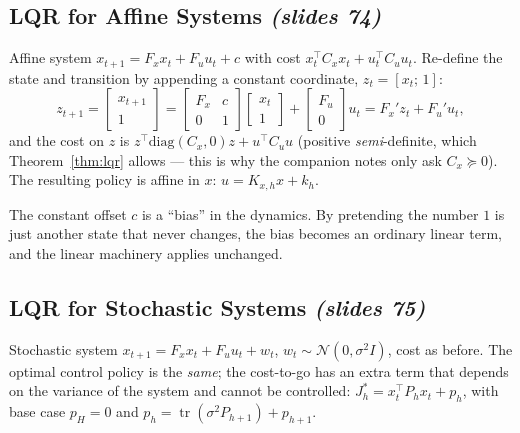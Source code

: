 \documentclass[11pt,a4paper]{article}
\newcommand{\tr}{\operatorname{tr}}
\newcommand{\slides}[1]{\emph{(slides #1)}}
\theoremstyle{plain}
\theoremstyle{definition}
\theoremstyle{remark}
\begin{document}
\subsection{LQR for Affine Systems \slides{74}}

Affine system $x_{t+1}=F_xx_t+F_uu_t+c$ with cost $x_t^\top C_xx_t+u_t^\top C_uu_t$. Re-define the state and transition by appending a constant coordinate, $z_t=[x_t;\,1]$:
\[
z_{t+1}=\begin{bmatrix}x_{t+1}\\1\end{bmatrix}=\begin{bmatrix}F_x&c\\0&1\end{bmatrix}\begin{bmatrix}x_t\\1\end{bmatrix}+\begin{bmatrix}F_u\\0\end{bmatrix}u_t=F_x'z_t+F_u'u_t,
\]
and the cost on $z$ is $z^\top\mathrm{diag}(C_x,0)z+u^\top C_uu$ (positive \emph{semi}-definite, which Theorem~\ref{thm:lqr} allows --- this is why the companion notes only ask $C_x\succeq0$). The resulting policy is affine in $x$: $u=K_{x,h}x+k_h$.
\begin{intuition}
The constant offset $c$ is a ``bias'' in the dynamics. By pretending the number $1$ is just another state that never changes, the bias becomes an ordinary linear term, and the linear machinery applies unchanged.
\end{intuition}

\subsection{LQR for Stochastic Systems \slides{75}}

Stochastic system $x_{t+1}=F_xx_t+F_uu_t+w_t$, $w_t\sim\mathcal N(0,\sigma^2I)$, cost as before. The optimal control policy is the \emph{same}; the cost-to-go has an extra term that depends on the variance of the system and cannot be controlled: $J^*_h=x_t^\top P_hx_t+p_h$, with base case $p_H=0$ and $p_h=\tr(\sigma^2P_{h+1})+p_{h+1}$.
\end{document}
